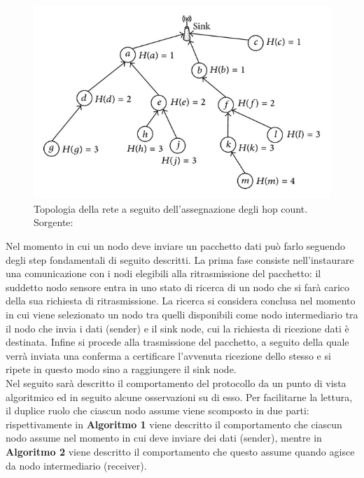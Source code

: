 \documentclass[binding=0.6cm,TFA]{sapthesis}
\begin{document}
\begin{figure}
    \begin{center}
        \includegraphics[scale=1.7]{hop-count-algorithm.png}
        \caption{Topologia della rete a seguito dell'assegnazione degli hop count. Sorgente: \cite{hop-count-figure}}
    \end{center}
\end{figure}

Nel momento in cui un nodo deve inviare un pacchetto dati può farlo seguendo degli step fondamentali di seguito descritti.
La prima fase consiste nell'instaurare una comunicazione con i nodi elegibili alla ritrasmissione del pacchetto: il suddetto nodo sensore
entra in uno stato di ricerca di un nodo che si farà carico della sua richiesta di ritrasmissione. La ricerca si considera conclusa
nel momento in cui viene selezionato un nodo tra quelli disponibili come nodo intermediario tra il nodo che invia i dati (sender) e il sink
node, cui la richiesta di ricezione dati è destinata. Infine si procede alla trasmissione del pacchetto, a seguito della quale
verrà inviata una conferma a certificare l'avvenuta ricezione dello stesso e si ripete in questo modo sino a raggiungere
il sink node.\\

Nel seguito sarà descritto il comportamento del protocollo da un punto di vista algoritmico ed in seguito alcune osservazioni su di esso.
Per facilitarne la lettura, il duplice ruolo che ciascun nodo assume viene scomposto in due parti: rispettivamente in \textbf{Algoritmo 1}
viene descritto il comportamento che ciascun nodo assume nel momento in cui deve inviare dei dati (sender), mentre in \textbf{Algoritmo 2}
viene descritto il comportamento che questo assume quando agisce da nodo intermediario (receiver).
\end{document}
